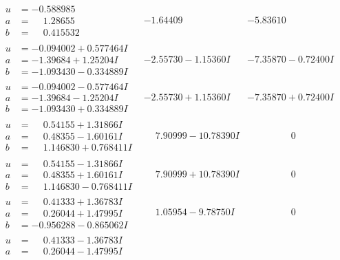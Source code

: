 \documentclass[1p]{elsarticle_modified}
\theoremstyle{definition}
\begin{document}
$$\begin{array}{c|c|c}
 \hline 
\begin{aligned}
u &= -0.588985\phantom{ +0.000000I} \\
a &= \phantom{-}1.28655\phantom{ +0.000000I} \\
b &= \phantom{-}0.415532\phantom{ +0.000000I}\end{aligned}
 & -1.64409\phantom{ +0.000000I} & -5.83610\phantom{ +0.000000I} \\ \hline\begin{aligned}
u &= -0.094002 + 0.577464 I \\
a &= -1.39684 + 1.25204 I \\
b &= -1.093430 - 0.334889 I\end{aligned}
 & -2.55730 - 1.15360 I & -7.35870 - 0.72400 I \\ \hline\begin{aligned}
u &= -0.094002 - 0.577464 I \\
a &= -1.39684 - 1.25204 I \\
b &= -1.093430 + 0.334889 I\end{aligned}
 & -2.55730 + 1.15360 I & -7.35870 + 0.72400 I \\ \hline\begin{aligned}
u &= \phantom{-}0.54155 + 1.31866 I \\
a &= \phantom{-}0.48355 - 1.60161 I \\
b &= \phantom{-}1.146830 + 0.768411 I\end{aligned}
 & \phantom{-}7.90999 - 10.78390 I & \phantom{-0.000000 } 0 \\ \hline\begin{aligned}
u &= \phantom{-}0.54155 - 1.31866 I \\
a &= \phantom{-}0.48355 + 1.60161 I \\
b &= \phantom{-}1.146830 - 0.768411 I\end{aligned}
 & \phantom{-}7.90999 + 10.78390 I & \phantom{-0.000000 } 0 \\ \hline\begin{aligned}
u &= \phantom{-}0.41333 + 1.36783 I \\
a &= \phantom{-}0.26044 + 1.47995 I \\
b &= -0.956288 - 0.865062 I\end{aligned}
 & \phantom{-}1.05954 - 9.78750 I & \phantom{-0.000000 } 0 \\ \hline\begin{aligned}
u &= \phantom{-}0.41333 - 1.36783 I \\
a &= \phantom{-}0.26044 - 1.47995 I \\

\end{aligned}
\end{array}$$
\end{document}
